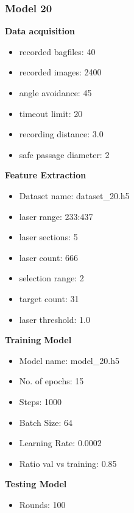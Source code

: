 \subsubsection{Model 20\label{model_20} }
\begin{multicols}{2}\textbf{Data acquisition}
\begin{itemize}
\setlength\itemsep{0.1em}
\item recorded bagfiles: 40
\item recorded images: 2400
\item angle avoidance: 45
\item timeout limit: 20
\item recording distance: 3.0
\item safe passage diameter: 2
\end{itemize}
\textbf{Feature Extraction}
\begin{itemize}
\setlength\itemsep{0.1em}
\item Dataset name: dataset\_20.h5
\item  laser range: 233:437
\item  laser sections: 5
\item  laser count: 666
\item  selection range: 2
\item  target count: 31
\item  laser threshold: 1.0
\end{itemize}
\columnbreak\textbf{Training Model}
\begin{itemize}
\setlength\itemsep{0.1em}
\item  Model name: model\_20.h5
\item  No. of epochs: 15
\item  Steps: 1000
\item  Batch Size: 64
\item  Learning Rate: 0.0002
\item  Ratio val vs training: 0.85
\end{itemize}
\textbf{Testing Model}
\begin{itemize}
\setlength\itemsep{0.1em}
\item Rounds: 100
\newline
\newline
\newline
\newline
\newline
\newline
\newline
\newline
\end{itemize}

\end{multicols}
